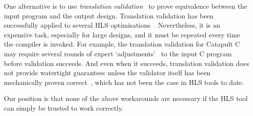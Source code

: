 One alternative is to use \emph{translation validation}~\cite{pnueli98_trans} to prove equivalence between the input program and the output design. Translation validation has been successfully applied to several HLS optimisations~\cite{kim04_autom_fsmd,karfa06_formal_verif_method_sched_high_synth,chouksey20_verif_sched_condit_behav_high_level_synth,banerjee14_verif_code_motion_techn_using_value_propag,chouksey19_trans_valid_code_motion_trans_invol_loops}.
Nevertheless, it is an expensive task, especially for large designs, and it must be repeated every time the compiler is invoked.
For example, the translation validation for Catapult C~\cite{mentor20_catap_high_level_synth} may require several rounds of expert `adjustments'~\cite[p.~3]{slec_whitepaper} to the input C program before validation succeeds. And even when it succeeds, translation validation does not provide watertight guarantees unless the validator itself has been mechanically proven correct~\cite[e.g.][]{tristan08_formal_verif_trans_valid}, which has not been the case in HLS tools to date.


Our position is that none of the above workarounds are necessary if the HLS tool can simply be trusted to work correctly. %

